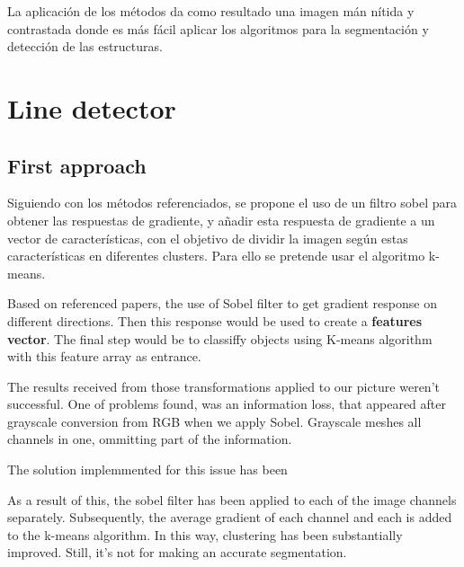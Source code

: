 \documentclass[12pt, a4paper]{article}
\begin{document}
La aplicación de los métodos da como resultado una imagen mán nítida y contrastada
 donde es más fácil aplicar los algoritmos para la segmentación y detección de las estructuras.


\section{Line detector}

\subsection{First approach}

Siguiendo con los métodos referenciados, se propone el uso de un filtro sobel para obtener
las respuestas de gradiente, y añadir esta respuesta de gradiente a un vector de características,
con el objetivo de dividir la imagen según estas características en diferentes clusters. Para ello se pretende usar el algoritmo
k-means. 

Based on referenced papers, the use of Sobel filter to get gradient response on different directions. Then 
this response would be used to create a \textbf{features vector}. The final step would be to classiffy objects 
using K-means algorithm with this feature array as entrance. 



The results received from those transformations applied to our picture weren't successful. One of problems found, was an 
information loss, that appeared after grayscale conversion from RGB when we apply Sobel. Grayscale meshes all channels in one, ommitting 
part of the information. 


The solution implemmented for this issue has been 

As a result of this, the sobel filter has been applied to each of the image channels separately. Subsequently, the average gradient of each
channel and each is added to the k-means algorithm. In this way, clustering has been substantially improved. Still, it's not for making
an accurate segmentation.
\end{document}
